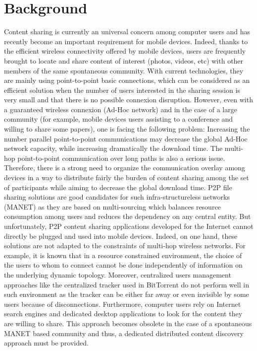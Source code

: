 \chapter{Background}
\label{chapter:background}
\minitoc

Content sharing is currently an universal concern among computer users and has recently become an important requirement for mobile devices. Indeed, thanks to the efficient wireless connectivity offered by mobile devices, users are frequently brought to locate and share content of interest (photos, videos, etc) with other members of the same spontaneous community. With current technologies, they are mainly using point-to-point basic connections, which can be considered as an efficient solution when the number of users interested in the sharing session is very small and that there is no possible connexion disruption. However, even with a guaranteed wireless connexion (Ad-Hoc network) and in the case of a large community (for example, mobile devices users assisting to a conference and willing to share some papers), one is facing the following problem: Increasing the number parallel point-to-point communications may decrease the global Ad-Hoc network capacity, while increasing dramatically the download time. The multi-hop point-to-point communication over long paths is also a serious issue. Therefore, there is a strong need to organize the communication overlay among devices in a way to distribute fairly the burden of content sharing among the set of participants while aiming to decrease the global download time. P2P file sharing solutions are good candidates for such infra-structureless networks (MANET) as they are based on multi-sourcing which balances resource consumption among users and reduces the dependency on any central entity. But unfortunately, P2P content sharing applications developed for the Internet cannot directly be plugged and used into mobile devices. Indeed, on one hand, these solutions are not adapted to the constraints of multi-hop wireless networks. For example, it is known that in a resource constrained environment, the choice of the users to whom to connect cannot be done independently of information on the underlying dynamic topology. Moreover, centralized users management approaches like the centralized tracker used in BitTorrent do not perform well in such environment as the tracker can be either far away or even invisible by some users because of disconnections. Furthermore, computer users rely on Internet search engines and dedicated desktop applications to look for the content they are willing to share. This approach becomes obsolete in the case of a spontaneous MANET based community and thus, a dedicated distributed content discovery approach must be provided. 

